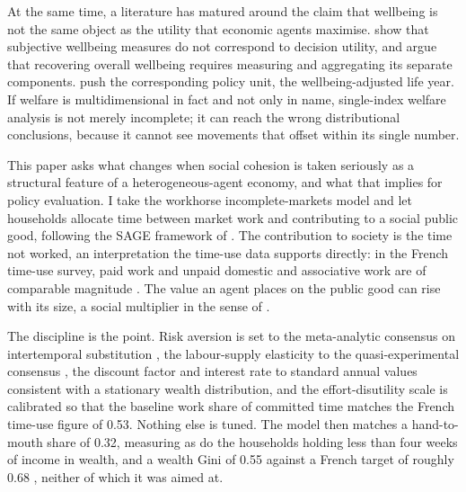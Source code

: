 \documentclass[11pt]{article}
\begin{document}
At the same time, a literature has matured around the claim that wellbeing is not the same object as the utility that economic agents maximise. \citet{benjamin2014,benjamin2023} show that subjective wellbeing measures do not correspond to decision utility, and argue that recovering overall wellbeing requires measuring and aggregating its separate components. \citet{layard2023} push the corresponding policy unit, the wellbeing-adjusted life year. If welfare is multidimensional in fact and not only in name, single-index welfare analysis is not merely incomplete; it can reach the wrong distributional conclusions, because it cannot see movements that offset within its single number.

This paper asks what changes when social cohesion is taken seriously as a structural feature of a heterogeneous-agent economy, and what that implies for policy evaluation. I take the workhorse incomplete-markets model \citep{bewley1986,aiyagari1994} and let households allocate time between market work and contributing to a social public good, following the SAGE framework of \citet{snower2020}. The contribution to society is the time not worked, an interpretation the time-use data supports directly: in the French time-use survey, paid work and unpaid domestic and associative work are of comparable magnitude \citep{roy2012}. The value an agent places on the public good can rise with its size, a social multiplier in the sense of \citet{glaeser2003}.

The discipline is the point. Risk aversion is set to the meta-analytic consensus on intertemporal substitution \citep{havranek2015}, the labour-supply elasticity to the quasi-experimental consensus \citep{chetty2011}, the discount factor and interest rate to standard annual values consistent with a stationary wealth distribution, and the effort-disutility scale is calibrated so that the baseline work share of committed time matches the French time-use figure of 0.53. Nothing else is tuned. The model then matches a hand-to-mouth share of 0.32, measuring as \citet{kaplan2014} do the households holding less than four weeks of income in wealth, and a wealth Gini of 0.55 against a French target of roughly 0.68 \citep{conway2025atlas}, neither of which it was aimed at.
\end{document}
